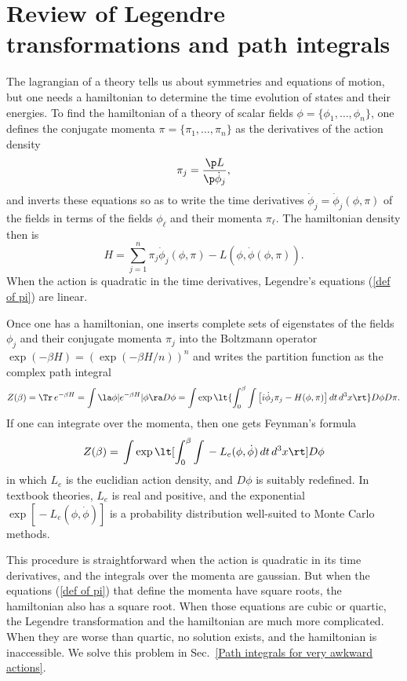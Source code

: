 \documentclass[prd,preprint,floatfix,showpacs]{revtex4-1}
\begin{document}
\section {Review of Legendre transformations and path integrals
\label {Review of Legendre transformations and path integrals} }

The lagrangian of a theory tells us about symmetries
and equations of motion, but one needs
a hamiltonian to determine 
the time evolution of states and their energies. 
To find the hamiltonian of a theory
of scalar fields 
\( \phi = \{\phi_1,\dots, \phi_n\} \),
one defines the conjugate momenta 
\( \pi = \{\pi_1,\dots, \pi_n\} \) as
the derivatives of the action density
\begin{equation}
\pi_j = \frac{\p  L }{\p \dot \phi_j} ,
\label {def of pi}
\end{equation}
and inverts these equations so as to
write the time derivatives 
\( \dot \phi_j = \dot \phi_j (\phi, \pi) \)
of the fields in terms of 
the fields \( \phi_\ell \) 
and their momenta \( \pi_\ell \)\@.
The hamiltonian density then is
\begin{equation}
H = \sum_{j=1}^n \pi_j \dot \phi_j(\phi,\pi) 
- L (\phi,\dot \phi(\phi,\pi) ) .
\label {energy density}
\end{equation}
When the action is quadratic 
in the time derivatives,
Legendre's equations (\ref {def of pi})
are linear.  
\par
Once one has a hamiltonian,
one inserts complete sets
of eigenstates of the fields \( \phi_j \) and 
their conjugate momenta \( \pi_j \)
into the Boltzmann operator 
\( \exp( - \beta H ) = ( \exp( - \beta H/n ) )^n \)
and writes the partition function as
the complex path integral
\begin{equation}
Z(\beta) ={} \Tr \, e^{-\beta H}
= \int \la \phi | e^{- \beta H} | \phi \ra D\phi = 
\int \exp \lt\{ \int_0^\beta \int \left[ i \dot \phi_j \pi_j 
- H(\phi, \pi) \right] dt \, d^3x \rt\} D\phi D\pi .
\label {leads to the partition function}
\end{equation}
If one can integrate over the momenta,
then one gets Feynman's formula
\begin{equation}
Z(\beta) ={} \int \exp 
\lt[ \int_0^\beta \int 
{} - L_e(\phi, \dot \phi) \, dt \, d^3x \rt] D\phi 
\label {one gets the classic formula}
\end{equation}
in which \( L_e \) is the euclidian
action density, and \( D\phi \) is suitably
redefined.
In textbook theories, \( L_e \) 
is real and positive, and
the exponential \( \exp[{} - L_e(\phi,\dot \phi) ] \)
is a probability distribution
well-suited to Monte Carlo methods.
\par
This procedure is straightforward when 
the action is quadratic
in its time derivatives, 
and the integrals over the momenta are gaussian.
But when the equations
(\ref {def of pi}) that define
the momenta have square roots,
the hamiltonian also has a square root.
When those equations are cubic
or quartic, the Legendre transformation
and the hamiltonian are much more
complicated.
When they are worse than
quartic, no solution exists, and the 
hamiltonian is inaccessible. 
We solve this problem in 
Sec.~\ref{Path integrals for very awkward actions}\@.
\end{document}
